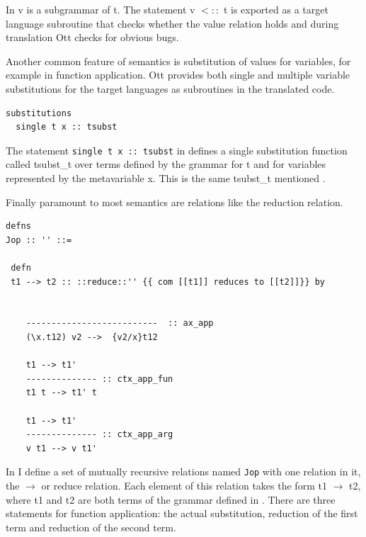 \documentclass[12pt,twoside,notitlepage]{report}
\theoremstyle{plain}%
\theoremstyle{definition}
\theoremstyle{remark}
\begin{document}
In  v is a subgrammar of t. The statement v $<::$ t is exported as a target language subroutine that checks whether the value relation holds and during translation Ott checks for obvious bugs.

Another common feature of semantics is substitution of values for variables, for example in function application. Ott provides both single and multiple variable substitutions for the target languages as subroutines in the translated code.


\vspace{3mm}

\begin{minipage}{\linewidth}

\begin{lstlisting}[language={Ott}, caption={Ott substitution example}, label={lst:ottsubstex}]
substitutions
  single t x :: tsubst 
\end{lstlisting}

\end{minipage}


The statement \lstinline[language={Ott}]|single t x :: tsubst| in  defines a single substitution function called tsubst\_t over terms defined by the grammar for t and for variables represented by the metavariable x. This is the same tsubst\_t mentioned .



Finally paramount to most semantics are relations like the reduction relation.\vspace{3mm}


\begin{minipage}{\linewidth}
\begin{lstlisting}[language={Ott}, caption={Ott reduction relation example}, label={lst:ottredex}]
defns
Jop :: '' ::=

 defn
 t1 --> t2 :: ::reduce::'' {{ com [[t1]] reduces to [[t2]]}} by


    --------------------------  :: ax_app
    (\x.t12) v2 -->  {v2/x}t12

    t1 --> t1'
    -------------- :: ctx_app_fun
    t1 t --> t1' t

    t1 --> t1'
    -------------- :: ctx_app_arg
    v t1 --> v t1'
\end{lstlisting}
\end{minipage}

In  I define a set of mutually recursive relations named \verb|Jop| with one relation in it, the $\longrightarrow$ or reduce relation. Each element of this relation takes the form t1 $\longrightarrow$ t2, where t1 and t2 are both terms of the grammar defined in . There are three statements for function application: the actual substitution, reduction of the first term and reduction of the second term. 
\end{document}
